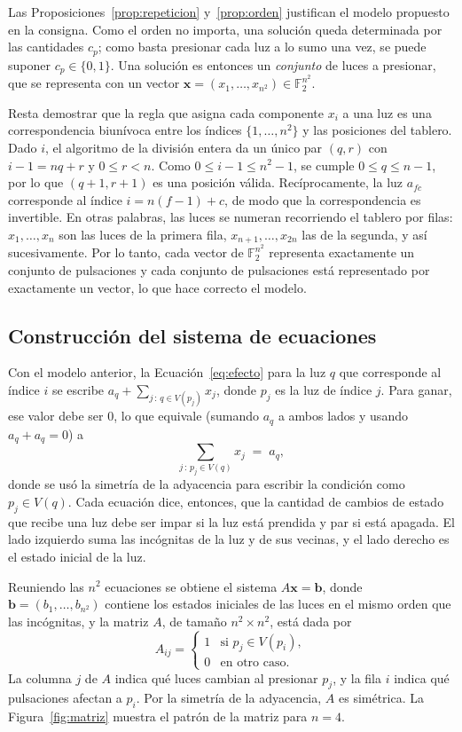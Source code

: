 \documentclass[12pt,a4paper]{article}
\theoremstyle{plain}
\theoremstyle{definition}
\theoremstyle{remark}
\newcommand{\F}{\mathbb{F}_2}
\newcommand{\V}{V}
\begin{document}
Las Proposiciones~\ref{prop:repeticion} y~\ref{prop:orden} justifican el modelo propuesto en la consigna. Como el orden no importa, una solución queda determinada por las cantidades $c_p$; como basta presionar cada luz a lo sumo una vez, se puede suponer $c_p\in\{0,1\}$. Una solución es entonces un \textit{conjunto} de luces a presionar, que se representa con un vector $\mathbf{x}=(x_1,\ldots,x_{n^2})\in\F^{n^2}$.

Resta demostrar que la regla que asigna cada componente $x_i$ a una luz es una correspondencia biunívoca entre los índices $\{1,\ldots,n^2\}$ y las posiciones del tablero. Dado $i$, el algoritmo de la división entera da un único par $(q,r)$ con $i-1=nq+r$ y $0\leq r<n$. Como $0\leq i-1\leq n^2-1$, se cumple $0\leq q\leq n-1$, por lo que $(q+1,r+1)$ es una posición válida. Recíprocamente, la luz $a_{fc}$ corresponde al índice $i=n(f-1)+c$, de modo que la correspondencia es invertible. En otras palabras, las luces se numeran recorriendo el tablero por filas: $x_1,\ldots,x_n$ son las luces de la primera fila, $x_{n+1},\ldots,x_{2n}$ las de la segunda, y así sucesivamente. Por lo tanto, cada vector de $\F^{n^2}$ representa exactamente un conjunto de pulsaciones y cada conjunto de pulsaciones está representado por exactamente un vector, lo que hace correcto el modelo.

\subsection{Construcción del sistema de ecuaciones}\label{sec:sistema}

Con el modelo anterior, la Ecuación~\eqref{eq:efecto} para la luz $q$ que corresponde al índice $i$ se escribe $a_q+\sum_{j\,:\,q\in\V(p_j)} x_j$, donde $p_j$ es la luz de índice $j$. Para ganar, ese valor debe ser 0, lo que equivale (sumando $a_q$ a ambos lados y usando $a_q+a_q=0$) a
\begin{equation}\label{eq:ecuacion_i}
\sum_{j\,:\,p_j\in\V(q)} x_j \;=\; a_q ,
\end{equation}
donde se usó la simetría de la adyacencia para escribir la condición como $p_j\in\V(q)$. Cada ecuación dice, entonces, que la cantidad de cambios de estado que recibe una luz debe ser impar si la luz está prendida y par si está apagada. El lado izquierdo suma las incógnitas de la luz y de sus vecinas, y el lado derecho es el estado inicial de la luz.

Reuniendo las $n^2$ ecuaciones se obtiene el sistema $A\mathbf{x}=\mathbf{b}$, donde $\mathbf{b}=(b_1,\ldots,b_{n^2})$ contiene los estados iniciales de las luces en el mismo orden que las incógnitas, y la matriz $A$, de tamaño $n^2\times n^2$, está dada por
\begin{equation}\label{eq:matriz}
A_{ij}=\begin{cases}1 & \text{si } p_j\in\V(p_i),\\ 0 & \text{en otro caso.}\end{cases}
\end{equation}
La columna $j$ de $A$ indica qué luces cambian al presionar $p_j$, y la fila $i$ indica qué pulsaciones afectan a $p_i$. Por la simetría de la adyacencia, $A$ es simétrica. La Figura~\ref{fig:matriz} muestra el patrón de la matriz para $n=4$.
\end{document}
